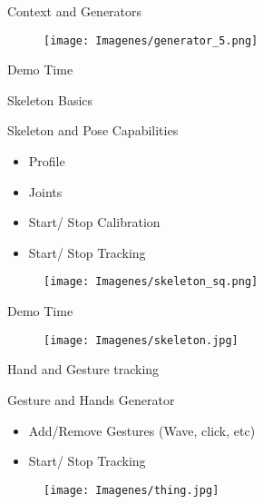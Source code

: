 \documentclass[bigger]{beamer}
\begin{document}
\begin{frame}{\ECFAugie Context and Generators}
\begin{figure}[h]
		\texttt{[image: Imagenes/generator\_5.png]}
\end{figure}
\end{frame}

\begin{frame}[fragile]{\ECFAugie Demo Time}
\begin{center}
\end{center}
\end{frame}

\begin{frame}{\ECFAugie Skeleton Basics}
\begin{minipage}{0.45\textwidth}
Skeleton and Pose Capabilities
\begin{itemize}
	\item Profile
	\item Joints
	\item Start/ Stop Calibration
	\item Start/ Stop Tracking
\end{itemize}
\end{minipage}
\begin{minipage}{0.45\textwidth}
\begin{figure}[h]
		\texttt{[image: Imagenes/skeleton\_sq.png]}
\end{figure}
\end{minipage}

\end{frame}

\begin{frame}{\ECFAugie Demo Time}
\begin{figure}[h]
		\texttt{[image: Imagenes/skeleton.jpg]}
\end{figure}
\end{frame}

\begin{frame}{\ECFAugie Hand and Gesture tracking}
\begin{minipage}{0.45\textwidth}
Gesture and Hands Generator
\begin{itemize}
	\item Add/Remove Gestures (Wave, click, etc)
	\item Start/ Stop Tracking
\end{itemize}
\end{minipage}
\begin{minipage}{0.45\textwidth}
\begin{figure}[h]
		\texttt{[image: Imagenes/thing.jpg]}
\end{figure}
\end{minipage}
\end{frame}
\end{document}
